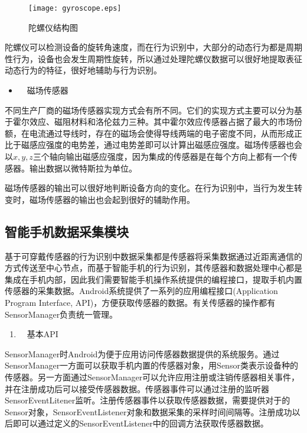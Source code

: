 \begin{figure}[htb]
\centering
\texttt{[image: gyroscope.eps]}
\caption{陀螺仪结构图}
\end{figure}

\par 陀螺仪可以检测设备的旋转角速度，而在行为识别中，大部分的动态行为都是周期性行为，设备也会发生周期性旋转，所以通过处理陀螺仪数据可以很好地提取表征动态行为的特征，很好地辅助与行为识别。

\begin{itemize}
	\item　磁场传感器
\end{itemize}
\par 不同生产厂商的磁场传感器实现方式会有所不同。它们的实现方式主要可以分为基于霍尔效应、磁阻材料和洛伦兹力三种。其中霍尔效应传感器占据了最大的市场份额，在电流通过导线时，存在的磁场会使得导线两端的电子密度不同，从而形成正比于磁感应强度的电势差，通过电势差即可以计算出磁感应强度。磁场传感器也会以$x,  y,  z$三个轴向输出磁感应强度，因为集成的传感器是在每个方向上都有一个传感器。输出数据以微特斯拉为单位。
\par 磁场传感器的输出可以很好地判断设备方向的变化。在行为识别中，当行为发生转变时，磁场传感器的输出也会起到很好的辅助作用。

\subsection{智能手机数据采集模块}
\par 基于可穿戴传感器的行为识别中数据采集都是传感器将采集数据通过近距离通信的方式传送至中心节点，而基于智能手机的行为识别，其传感器和数据处理中心都是集成在手机内部，因此我们需要智能手机操作系统提供的编程接口，提取手机内置传感器的采集数据。Android系统提供了一系列的应用编程接口(Application Program Interface, API)，方便获取传感器的数据。有关传感器的操作都有SensorManager负责统一管理。

\begin{enumerate}[(1)]
	\item　基本API
\end{enumerate}
\par SensorManager时Android为便于应用访问传感器数据提供的系统服务。通过SensorManager一方面可以获取手机内置的传感器对象，用Sensor类表示设备种的传感器。另一方面通过SensorManager可以允许应用注册或注销传感器相关事件，并在注册成功后可以接受传感器数据。传感器事件可以通过注册的监听器SensorEventLitener监听。注册传感器事件以获取传感器数据，需要提供对于的Sensor对象，SensorEventListener对象和数据采集的采样时间间隔等。注册成功以后即可以通过定义的SensorEventListener中的回调方法获取传感器数据。

